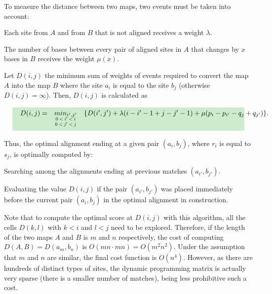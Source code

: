 {To measure the distance between two maps, two events must be taken into account:
\begin{menumerate}
\item
Each site from $A$ and from $B$ that is not aligned receives a weight $\lambda$.
\item
The number of bases between every pair of aligned sites in $A$ that changes by $x$ bases in $B$
receives the weight $\mu(x)$.
\end{menumerate}

Let $D(i,j)$ the minimum sum of weights of events required to convert the map $A$ into the map $B$
where the site $a_i$ is equal to the site $b_j$ (otherwise $D(i,j) = \infty$). Then, $D(i,j)$ is
calculated as 

\begin{center}
\begin{equation}
\fcolorbox{white}{verylightgreen}{
\begin{minipage}[][][c]{0.95\linewidth}
$\begin{array}{ccc}
D(i,j) = & min_{i',j'} & \{D(i',j') + \lambda (i - i' - 1 + j - j'- 1) + \mu
(p_i - p_{i'} - q_j + q_{j'})\}.\\[-1ex]
& \scalebox{0.7}{\mbox{$0 < i' < i$}} & \\[-1ex]
& \scalebox{0.7}{\mbox{$0 < j' < j$}} & \\
\end{array}$
\label{eq:map}
\end{minipage}}
\end{equation}
\end{center}

Thus, the optimal alignment ending at a given pair $(a_i,b_j)$, where $r_i$ is equal to $s_j$, 
is optimally computed by:

\begin{menumerate}
\item Searching among the alignments ending at previous matches $(a_{i'},b_{j'})$.
\item Evaluating the value $D(i,j)$ if the pair $(a_{i'},b_{j'})$ was placed immediately before the current
pair $(a_i,b_j)$ in the optimal alignment in construction.
\end{menumerate}

Note that to compute the optimal score at $D(i,j)$ with this algorithm, all the cells $D(k,l)$ with $k<i$ 
and $l<j$ need to be explored. Therefore, if the length of the two maps $A$ 
and $B$ is $m$ and $n$ respectively, the cost of computing $D(A,B)=D(a_m,b_n)$ is $O(mn \cdot mn) = O(m^2n^2)$. 
Under the assumption that $m$ and $n$ are similar, the final cost function is $O(n^4)$. However, as 
there are hundreds of distinct types of sites, the dynamic programming matrix is actually very sparse (there is a 
smaller number of matches), being less prohibitive such a cost.


}
